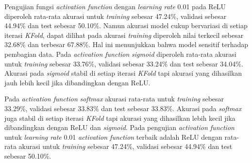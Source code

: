    Pengujian fungsi \textit{activation function} dengan \textit{learning rate} 0.01 
    pada ReLU diperoleh rata-rata akurasi untuk \textit{training} sebesar 47.24\%, validasi sebesar 44.94\% dan test sebesar 50.10\%. Namun akurasi model cukup bervariasi di setiap iterasi \textit{KFold}, dapat dilihat pada akurasi \textit{training} diperoleh nilai terkecil sebesar 32.68\% dan terbesar 67.88\%.
    Hal ini menunjukkan bahwa model sensitif terhadap pembagian data. Pada \textit{activation function} \textit{sigmoid} diperoleh rata-rata akurasi untuk \textit{training} sebesar 33.76\%, validasi sebesar 33.24\% dan test sebesar 34.04\%. Akurasi pada \textit{sigmoid} stabil di setiap iterasi \textit{KFold} tapi akurasi yang dihasilkan jauh lebih kecil jika dibandingkan dengan ReLU.
    
    Pada \textit{activation function} \textit{softmax} akurasi rata-rata untuk \textit{training} sebesar 33.29\%, validasi sebesar 33.83\% dan test sebesar 33.83\%. Akurasi pada \textit{softmax} juga stabil di setiap iterasi \textit{KFold} tapi akurasi yang dihasilkan lebih kecil jika dibandingkan dengan ReLU dan \textit{sigmoid}. Pada pengujian \textit{activation function} untuk \textit{learning rate} 0.01 \textit{activation function} terbaik adalah ReLU dengan rata-rata akurasi untuk \textit{training} sebesar 47.24\%, validasi sebesar 44.94\% dan test sebesar 50.10\%.

    

